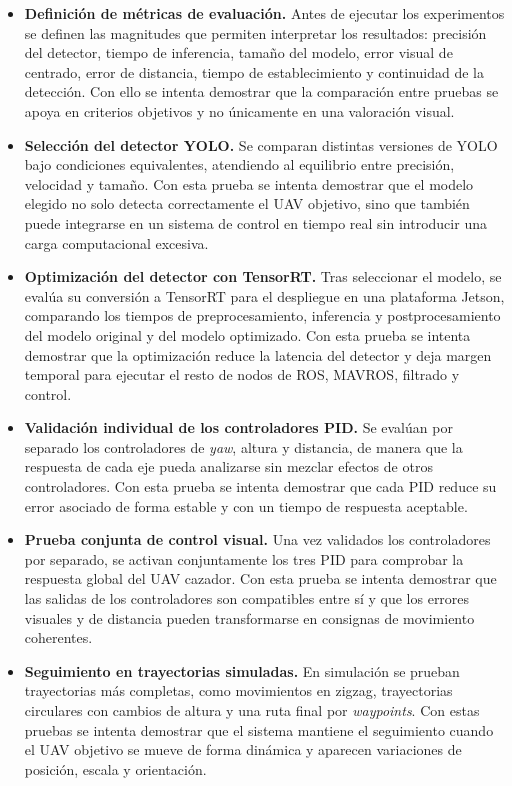 \begin{itemize}
    \item \textbf{Definición de métricas de evaluación.} Antes de ejecutar los experimentos se definen las magnitudes que permiten interpretar los resultados: precisión del detector, tiempo de inferencia, tamaño del modelo, error visual de centrado, error de distancia, tiempo de establecimiento y continuidad de la detección. Con ello se intenta demostrar que la comparación entre pruebas se apoya en criterios objetivos y no únicamente en una valoración visual.

    \item \textbf{Selección del detector YOLO.} Se comparan distintas versiones de YOLO bajo condiciones equivalentes, atendiendo al equilibrio entre precisión, velocidad y tamaño. Con esta prueba se intenta demostrar que el modelo elegido no solo detecta correctamente el UAV objetivo, sino que también puede integrarse en un sistema de control en tiempo real sin introducir una carga computacional excesiva.

    \item \textbf{Optimización del detector con TensorRT.} Tras seleccionar el modelo, se evalúa su conversión a TensorRT para el despliegue en una plataforma Jetson, comparando los tiempos de preprocesamiento, inferencia y postprocesamiento del modelo original y del modelo optimizado. Con esta prueba se intenta demostrar que la optimización reduce la latencia del detector y deja margen temporal para ejecutar el resto de nodos de ROS, MAVROS, filtrado y control.

    \item \textbf{Validación individual de los controladores PID.} Se evalúan por separado los controladores de \textit{yaw}, altura y distancia, de manera que la respuesta de cada eje pueda analizarse sin mezclar efectos de otros controladores. Con esta prueba se intenta demostrar que cada PID reduce su error asociado de forma estable y con un tiempo de respuesta aceptable.

    \item \textbf{Prueba conjunta de control visual.} Una vez validados los controladores por separado, se activan conjuntamente los tres PID para comprobar la respuesta global del UAV cazador. Con esta prueba se intenta demostrar que las salidas de los controladores son compatibles entre sí y que los errores visuales y de distancia pueden transformarse en consignas de movimiento coherentes.

    \item \textbf{Seguimiento en trayectorias simuladas.} En simulación se prueban trayectorias más completas, como movimientos en zigzag, trayectorias circulares con cambios de altura y una ruta final por \textit{waypoints}. Con estas pruebas se intenta demostrar que el sistema mantiene el seguimiento cuando el UAV objetivo se mueve de forma dinámica y aparecen variaciones de posición, escala y orientación.


\end{itemize}
